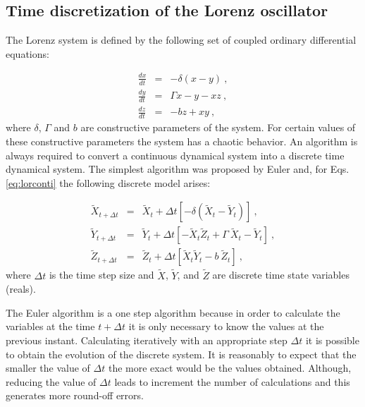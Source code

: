 \subsection{Time discretization of the Lorenz oscillator}
\label{sec:lorenzdigit}

The Lorenz system is defined by the following set of coupled
ordinary differential equations:

%
\begin{eqnarray} \label{eq:lorconti}
\frac{dx}{dt}&=&-\delta(x-y) \ , \nonumber \\
\frac{dy}{dt}&=&\Gamma x-y-xz \ , \\
\frac{dz}{dt}&=&-bz+xy \ , \nonumber
\end{eqnarray}
%
where $\delta$, $\Gamma$ and $b$ are constructive parameters of
the system. For certain values of these constructive parameters the
system has a chaotic behavior.
%
An algorithm is always required to convert a continuous dynamical
system into a discrete time dynamical system. The simplest
algorithm was proposed by Euler and, for Eqs. \ref{eq:lorconti}
the following discrete model arises:

\begin{eqnarray}\label{eq:loreuler}
{\widetilde X}_{t+\Delta t}&=&{\widetilde X}_{t}+ \Delta t \left[
- \delta \left( {\widetilde X}_{t}-{\widetilde Y}_{t} \right)
\right]
\ , \nonumber \\
{\widetilde Y}_{t+\Delta t}&=&{\widetilde Y}_{t}+ \Delta t \left[
-{\widetilde X}_{t}{\widetilde Z}_{t}+\Gamma~{\widetilde
X}_{t}-{\widetilde Y}_{t} \right] \ ,
\\
{\widetilde Z}_{t+\Delta t}&=&{\widetilde Z}_{t}+ \Delta t \left[
{\widetilde X}_{t}{\widetilde Y}_{t}-b~{\widetilde Z}_{t} \right]
\ , \nonumber
\end{eqnarray}
%
where $\Delta t$ is the time step size and $\widetilde X$,
$\widetilde Y$, and $\widetilde Z$ are discrete time state
variables (reals).

The Euler algorithm is a one step algorithm because in order to
calculate the variables at the time $t+ \Delta t$ it is only
necessary to know the values at the previous instant. Calculating iteratively with an appropriate step $\Delta t$ it is
possible to obtain the evolution of the discrete system. It is reasonably to expect that the smaller the value of $\Delta
t$ the more exact would be the values obtained. Although, reducing
the value of $\Delta t$ leads to increment the number of
calculations and this generates more round-off errors.

